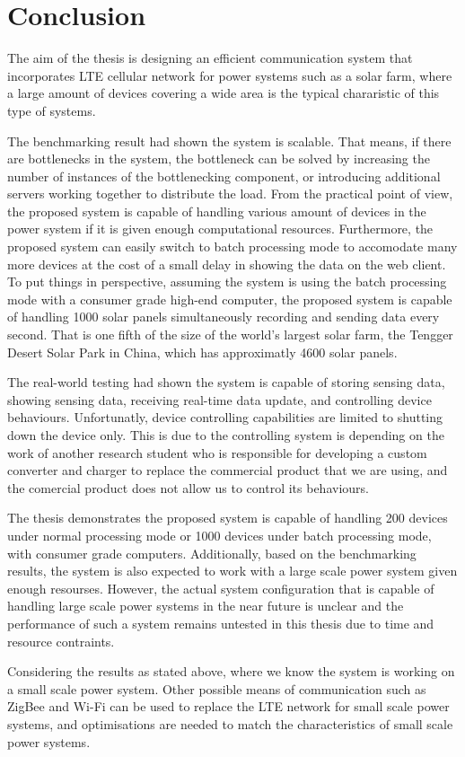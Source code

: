\documentclass[../thesis.tex]{subfiles}
\begin{document}
\chapter{Conclusion}
\label{chap:conclu}

The aim of the thesis is designing an efficient communication system that incorporates LTE cellular network for power systems such as a solar farm, where a large amount of devices covering a wide area is the typical chararistic of this type of systems. 

The benchmarking result had shown the system is scalable. That means, if there are bottlenecks in the system, the bottleneck can be solved by increasing the number of instances of the bottlenecking component, or introducing additional servers working together to distribute the load. From the practical point of view, the proposed system is capable of handling various amount of devices in the power system if it is given enough computational resources. Furthermore, the proposed system can easily switch to batch processing mode to accomodate many more devices at the cost of a small delay in showing the data on the web client. To put things in perspective, assuming the system is using the batch processing mode with a consumer grade high-end computer, the proposed system is capable of handling 1000 solar panels simultaneously recording and sending data every second. That is one fifth of the size of the world's largest solar farm, the Tengger Desert Solar Park in China, which has approximatly 4600 solar panels\cite{gienergy}. 

The real-world testing had shown the system is capable of storing sensing data, showing sensing data, receiving real-time data update, and controlling device behaviours. Unfortunatly, device controlling capabilities are limited to shutting down the device only. This is due to the controlling system is depending on the work of another research student who is responsible for developing a custom converter and charger to replace the commercial product that we are using, and the comercial product does not allow us to control its behaviours. 

The thesis demonstrates the proposed system is capable of handling 200 devices under normal processing mode or 1000 devices under batch processing mode, with consumer grade computers. Additionally, based on the benchmarking results, the system is also expected to work with a large scale power system given enough resourses. However, the actual system configuration that is capable of handling large scale power systems in the near future is unclear and the performance of such a system remains untested in this thesis due to time and resource contraints. 

Considering the results as stated above, where we know the system is working on a small scale power system. Other possible means of communication such as ZigBee and Wi-Fi can be used to replace the LTE network for small scale power systems, and optimisations are needed to match the characteristics of small scale power systems.
\end{document}
